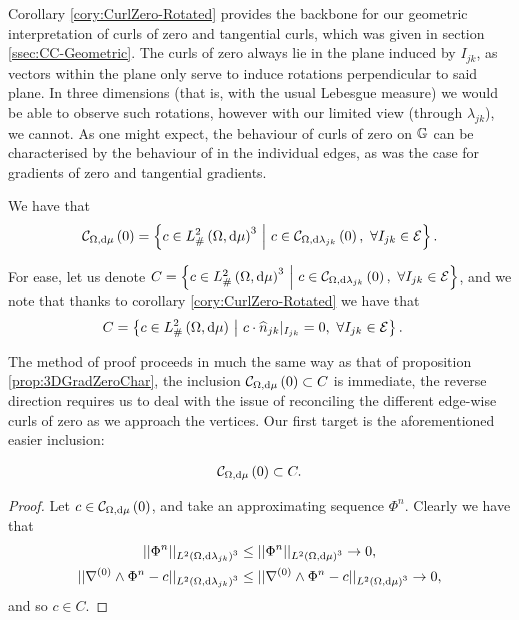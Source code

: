 Corollary \ref{cory:CurlZero-Rotated} provides the backbone for our geometric interpretation of curls of zero and tangential curls, which was given in section \ref{ssec:CC-Geometric}.
The curls of zero always lie in the plane induced by $I_{jk}$, as vectors within the plane only serve to induce rotations perpendicular to said plane.
In three dimensions (that is, with the usual Lebesgue measure) we would be able to observe such rotations, however with our limited view (through $\lambda_{jk}$), we cannot.
As one might expect, the behaviour of curls of zero on $\mathbb{G}$ can be characterised by the behaviour of in the individual edges, as was the case for gradients of zero and tangential gradients.
\begin{theorem} \label{thm:CurlZeroChar}
	We have that
	\begin{align*}
		\mathcal{C}_{ \Omega, \mathrm{d}\mu}\left( 0 \right) = \left\{  c\in L^2_{\#}\left( \Omega,\mathrm{d} \mu \right)^3 \ \middle\vert \  c\in\mathcal{C}_{ \Omega, \mathrm{d}\lambda_{jk}}\left( 0 \right), \ \forall I_{jk}\in\mathcal{E}  \right\}.
	\end{align*}
\end{theorem}
For ease, let us denote $C = \left\{  c\in L^2_{\#}\left( \Omega,\mathrm{d} \mu \right)^3 \ \middle\vert \  c\in\mathcal{C}_{ \Omega, \mathrm{d}\lambda_{jk}}\left( 0 \right), \ \forall I_{jk}\in\mathcal{E}  \right\}$, and we note that thanks to corollary \ref{cory:CurlZero-Rotated} we have that
\begin{align*}
	C &= \left\{  c\in L^2_{\#}\left( \Omega,\mathrm{d} \mu \right) \ \middle\vert \  c\cdot\widehat{n}_{jk}\vert_{I_{jk}}=0, \ \forall I_{jk}\in\mathcal{E}  \right\}.
\end{align*}

The method of proof proceeds in much the same way as that of proposition \ref{prop:3DGradZeroChar}, the inclusion $\mathcal{C}_{ \Omega, \mathrm{d}\mu}\left( 0 \right)\subset C$ is immediate, the reverse direction requires us to deal with the issue of reconciling the different edge-wise curls of zero as we approach the vertices.
Our first target is the aforementioned easier inclusion:
\begin{lemma} \label{lem:CurlZeroInC}
	\begin{align*}
		\mathcal{C}_{ \Omega, \mathrm{d}\mu}\left( 0 \right) \subset C.
	\end{align*}
\end{lemma}
\begin{proof}
	Let $c\in\mathcal{C}_{ \Omega, \mathrm{d}\mu}\left( 0 \right)$, and take an approximating sequence $\Phi^n$.
	Clearly we have that
	\begin{align*}
		\lvert\lvert  \Phi^n  \rvert\rvert_{L^{2}\left( \Omega,\mathrm{d} \lambda_{jk} \right)^3} &\leq \lvert\lvert  \Phi^n  \rvert\rvert_{L^{2}\left( \Omega,\mathrm{d} \mu \right)^3} \rightarrow 0, \\
		\lvert\lvert  \nabla^{(0)}\wedge\Phi^n - c  \rvert\rvert_{L^{2}\left( \Omega,\mathrm{d} \lambda_{jk} \right)^3} & \leq \lvert\lvert  \nabla^{(0)}\wedge\Phi^n - c  \rvert\rvert_{L^{2}\left( \Omega,\mathrm{d} \mu \right)^3} \rightarrow 0,
	\end{align*}
	and so $c\in C$.
\end{proof}

